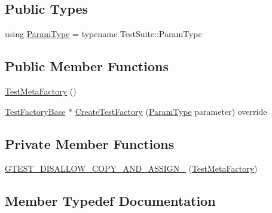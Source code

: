 \subsection*{Public Types}
\begin{DoxyCompactItemize}
\item 
using \hyperlink{classtesting_1_1internal_1_1TestMetaFactory_a392ebab15dfdcfa1b54bbe15878aa9cd}{Param\+Type} = typename Test\+Suite\+::\+Param\+Type
\end{DoxyCompactItemize}
\subsection*{Public Member Functions}
\begin{DoxyCompactItemize}
\item 
\hyperlink{classtesting_1_1internal_1_1TestMetaFactory_a1a48d63fbff650741c8f718af5c373d2}{Test\+Meta\+Factory} ()
\item 
\hyperlink{classtesting_1_1internal_1_1TestFactoryBase}{Test\+Factory\+Base} $\ast$ \hyperlink{classtesting_1_1internal_1_1TestMetaFactory_abd5d30fab71229deb5e63f5bb5ea3fd8}{Create\+Test\+Factory} (\hyperlink{classtesting_1_1internal_1_1TestMetaFactory_a392ebab15dfdcfa1b54bbe15878aa9cd}{Param\+Type} parameter) override
\end{DoxyCompactItemize}
\subsection*{Private Member Functions}
\begin{DoxyCompactItemize}
\item 
\hyperlink{classtesting_1_1internal_1_1TestMetaFactory_a058168d58de97a9d8dfb7400ad878148}{G\+T\+E\+S\+T\+\_\+\+D\+I\+S\+A\+L\+L\+O\+W\+\_\+\+C\+O\+P\+Y\+\_\+\+A\+N\+D\+\_\+\+A\+S\+S\+I\+G\+N\+\_\+} (\hyperlink{classtesting_1_1internal_1_1TestMetaFactory}{Test\+Meta\+Factory})
\end{DoxyCompactItemize}


\subsection{Member Typedef Documentation}
\mbox{\label{classtesting_1_1internal_1_1TestMetaFactory_a392ebab15dfdcfa1b54bbe15878aa9cd}} 
